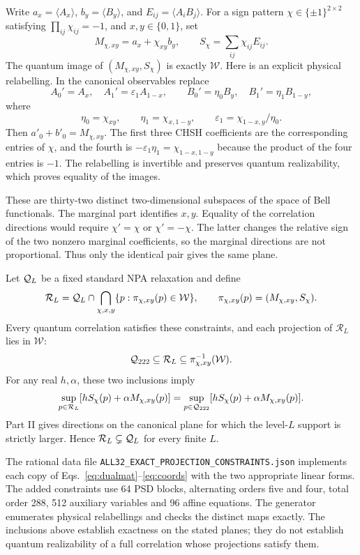 \documentclass[11pt]{article}
\theoremstyle{remark}\newtheorem{remark}[theorem]{Remark}
\newcommand{\W}{\mathcal W}\newcommand{\sxdeg}{\operatorname{sxdeg}}
\begin{document}
Write $a_x=\langle A_x\rangle$, $b_y=\langle B_y\rangle$, and
$E_{ij}=\langle A_iB_j\rangle$. For a sign pattern $\chi\in\{\pm1\}^{2\times2}$ satisfying
$\prod_{ij}\chi_{ij}=-1$, and $x,y\in\{0,1\}$, set
\[
 M_{\chi,xy}=a_x+\chi_{xy}b_y,\qquad
 S_\chi=\sum_{ij}\chi_{ij}E_{ij}.
\]
The quantum image of $(M_{\chi,xy},S_\chi)$ is exactly $\W$.
Here is an explicit physical relabelling. In the canonical observables
replace
\[
 A_0'=A_x,\quad A_1'=\varepsilon_1 A_{1-x},\qquad
 B_0'=\eta_0B_y,\quad B_1'=\eta_1B_{1-y},
\]
where
\[
 \eta_0=\chi_{xy},\qquad
 \eta_1=\chi_{x,1-y},\qquad
 \varepsilon_1=\chi_{1-x,y}/\eta_0.
\]
Then $a'_0+b'_0=M_{\chi,xy}$. The first three CHSH coefficients
are the corresponding entries of $\chi$, and the fourth is
$-\varepsilon_1\eta_1=\chi_{1-x,1-y}$ because the product of
the four entries is $-1$. The relabelling is invertible and preserves
quantum realizability, which proves equality of the images.

These are thirty-two distinct two-dimensional subspaces of the
space of Bell functionals. The marginal part identifies $x,y$.
Equality of the correlation directions would require
$\chi'=\chi$ or $\chi'=-\chi$.
The latter changes the relative sign of the two nonzero marginal
coefficients, so the marginal directions are not proportional.
Thus only the identical pair gives the same plane.

Let $\mathcal Q_L$ be a fixed standard NPA relaxation and define
\[
 \mathcal R_L=\Q_L\cap
 \bigcap_{\chi,x,y}\{p:\pi_{\chi,xy}(p)\in\W\},\qquad
 \pi_{\chi,xy}(p)=(M_{\chi,xy},S_\chi).
\]
Every quantum correlation satisfies these constraints, and each projection
of $\mathcal R_L$ lies in $\W$:
\[
 \Q_{222}\subseteq\mathcal R_L\subseteq
 \pi_{\chi,xy}^{-1}(\W).
\]
For any real $h,\alpha$, these two inclusions imply
\[
 \sup_{p\in\mathcal R_L}
 [hS_\chi(p)+\alpha M_{\chi,xy}(p)]
 =
 \sup_{p\in\mathcal Q_{222}}
 [hS_\chi(p)+\alpha M_{\chi,xy}(p)] .
\]
Part II gives directions on the canonical plane for which the
level-$L$ support is strictly larger. Hence
$\mathcal R_L\subsetneq\mathcal Q_L$ for every finite $L$.

The rational data file
\texttt{ALL32\_EXACT\_PROJECTION\_CONSTRAINTS.json}
implements each copy of Eqs.~\eqref{eq:dualmat}--\eqref{eq:coords}
with the two appropriate linear forms. The added constraints use
64 PSD blocks, alternating orders five and four, total order 288,
512 auxiliary variables and 96 affine equations. The generator enumerates
physical relabellings and checks the distinct maps exactly.
The inclusions above establish exactness on the stated planes;
they do not establish quantum realizability of a full correlation whose
projections satisfy them.
\end{document}
